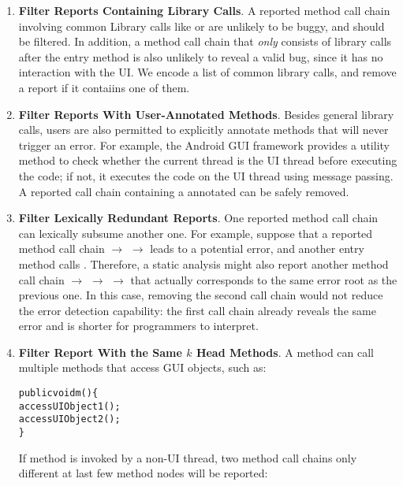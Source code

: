 \begin{enumerate}

\item \textbf{Filter Reports Containing Library Calls}. A
reported method call chain involving common Library calls
like  or  are unlikely to
be buggy, and should be filtered. In addition, a method call chain that \textit{only}
consists of library calls after the entry method is also unlikely
to reveal a valid bug, since it has no interaction with the UI. 
We encode a list of common library calls, and remove
a report if it contaiins one of them.

\item \textbf{Filter Reports With User-Annotated Methods}. Besides general
library calls, users are also permitted
to explicitly annotate methods that will never trigger an error.
For example, the Android GUI framework provides a utility method 
 to check whether the current thread is the UI thread
before executing the code; if
not, it executes the code on the UI thread using message passing.
A reported call chain containing a annotated 
can be safely removed.

\item \textbf{Filter Lexically Redundant Reports}. One reported method call
chain can lexically subsume another one. For example, suppose that a reported method
call chain  $\rightarrow$  $\rightarrow$ 
leads to a potential error, and another entry method  calls .
Therefore, a static analysis might also report another method call chain
 $\rightarrow$  $\rightarrow$  $\rightarrow$ 
that actually corresponds to the same error root as the previous one. In this case, 
 removing the second call chain would not reduce the error detection capability:
the first call chain already reveals the same error and is shorter 
for programmers to interpret.


\item \textbf{Filter Report With the Same $k$ Head Methods}. A method can call
multiple methods that access GUI objects, such as:
\begin{CodeOut}
\begin{alltt}
     public void m() \{
         accessUIObject1();
         accessUIObject2();
     \}
\end{alltt}
\end{CodeOut}
If method  is invoked by a non-UI thread, two method call chains
only different at last few method nodes will be reported:


\end{enumerate}
